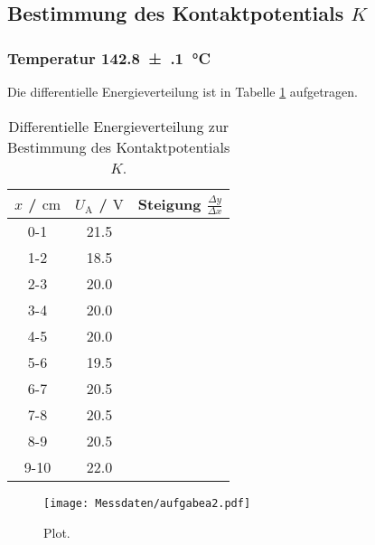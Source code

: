 \subsection{Bestimmung des Kontaktpotentials $K$}
\subsubsection{Temperatur \SI{142.8(1)}{\celsius}}
Die differentielle Energieverteilung ist in Tabelle \ref{tab:steigisdreieckslol} aufgetragen.
\begin{table}
	\centering
	\caption{Differentielle Energieverteilung zur Bestimmung des Kontaktpotentials $K$.}
	\label{tab:steigisdreieckslol}
	\begin{tabular}{ccc}
		\toprule
		$x$ / $\si{\centi\meter}$ & $U_{\mathrm{A}}$ / $\si{\volt}$ & Steigung $\frac{\Delta y}{\Delta x}$ \\
		\midrule
		0-1 & 21.5 \\
		1-2 & 18.5 \\
		2-3 & 20.0 \\
		3-4 & 20.0 \\
		4-5 & 20.0 \\
		5-6 & 19.5 \\
		6-7 & 20.5 \\
		7-8 & 20.5 \\
		8-9 & 20.5 \\
		9-10 & 22.0 \\
		\bottomrule
	\end{tabular}
\end{table}
\begin{figure}
	\centering
	\texttt{[image: Messdaten/aufgabea2.pdf]}
	\caption{Plot.}
	\label{fig:aufgabeA2}
\end{figure}





\FloatBarrier
